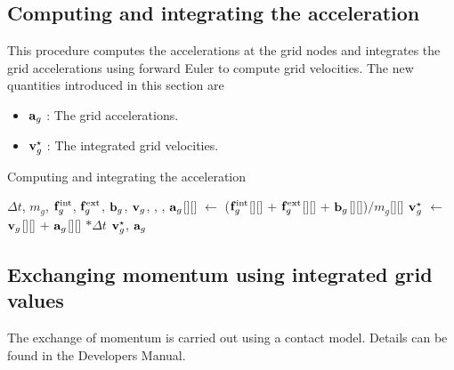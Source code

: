 \subsection{Computing and integrating the acceleration}
This procedure computes the accelerations at the grid nodes and integrates the grid accelerations
using forward Euler to compute grid velocities. The new quantities introduced in this section are
\begin{itemize} 
  \setlength\itemsep{1pt}
  \item $\mathbf{a}_{g}$ : {\Ochre The grid accelerations.}
  \item $\mathbf{v}_{g}^\star$ : {\Ochre The integrated grid velocities.}
\end{itemize}
\begin{breakablealgorithm}
  \caption{Computing and integrating the acceleration}
  \begin{algorithmic}[1]
    \Require $\Delta t$, $m_g$, $\mathbf{f}^{\text{int}}_g$, $\mathbf{f}^{\text{ext}}_g$, $\mathbf{b}_g$, $\mathbf{v}_g$,
             , ,
          \State $\mathbf{a}_g$[\TTmatl][\TTnode] $\leftarrow$ 
            ($\mathbf{f}^{\text{int}}_g$[\TTmatl][\TTnode] +
             $\mathbf{f}^{\text{ext}}_g$[\TTmatl][\TTnode] + 
             $\mathbf{b}_g$[\TTmatl][\TTnode])$/m_g$[\TTmatl][\TTnode]
          \State $\mathbf{v}_g^{\star}$ $\leftarrow$ $\mathbf{v}_g$[\TTmatl][\TTnode] + 
            $\mathbf{a}_g$[\TTmatl][\TTnode] $* \Delta t$
        \EndFor
      \EndFor
      \State \Return $\mathbf{v}_g^{\star}$, $\mathbf{a}_g$
    \EndProcedure
  \end{algorithmic}
\end{breakablealgorithm}

\subsection{Exchanging momentum using integrated grid values}
The exchange of momentum is carried out using a contact model.  Details can be found in the
\Vaango Developers Manual.

